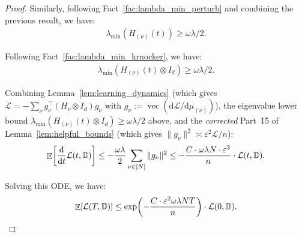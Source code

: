 \documentclass[11pt]{article}
\theoremstyle{plain}
\renewcommand{\d}{\mathrm{d}}
\DeclareMathOperator*{\E}{{\mathbb{E}}}
\DeclareMathOperator{\vect}{vec}
\begin{document}
\begin{proof}
    Similarly, following Fact~\ref{fac:lambda_min_perturb} and combining the previous result, we have:
    \begin{align*}
        \lambda_{\min}(H_{(\nu)}(t)) \ge \omega \lambda / 2.
    \end{align*}

    Following Fact~\ref{fac:lambda_min_krnocker}, we have:
    \begin{align*}
        \lambda_{\min}(H_{(\nu)}(t) \otimes I_d ) \ge \omega\lambda / 2.
    \end{align*}

    Combining Lemma~\ref{lem:learning_dynamics} (which gives $\dot{\mathcal{L}} = -\sum_\nu g_\nu^\top (H_\nu\otimes I_d) g_\nu$ with $g_\nu := \vect(\d\mathcal{L}/\d\mu_{(\nu)})$), the eigenvalue lower bound $\lambda_{\min}(H_{(\nu)}(t)\otimes I_d) \ge \omega\lambda/2$ above, and the {\it corrected} Part~15 of Lemma~\ref{lem:helpful_bounds} (which gives $\|g_\nu\|^2 \asymp \varepsilon^2 \mathcal{L}/n$):
    \begin{align*}
        \E\!\left[\frac{\d }{\d t}{\cal L}(t, \mathbb{D})\right] \leq - \frac{\omega\lambda}{2}\sum_{\nu\in[N]}\|g_\nu\|^2 \le - \frac{C \cdot \omega \lambda N \cdot \varepsilon^2}{n} \cdot {\cal L}(t, \mathbb{D}).
    \end{align*}

    Solving this ODE, we have:
    \begin{align}\label{eq:dynamic_loss}
        \E[{\cal L}(T, \mathbb{D})] \leq \exp\!\left(- \frac{C \cdot \varepsilon^2  \omega\lambda NT}{n}\right) \cdot {\cal L}(0, \mathbb{D}).
    \end{align}


\end{proof}
\end{document}
